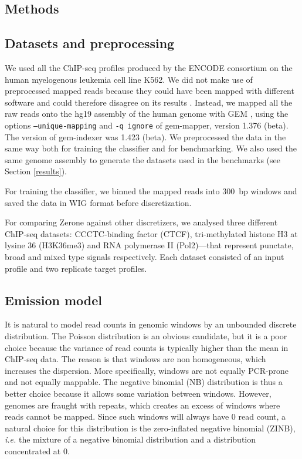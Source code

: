 \documentclass{bioinfo}
\begin{document}
\begin{methods}
\section{Methods}

\subsection{Datasets and preprocessing}
We used all the ChIP-seq profiles produced by the ENCODE consortium on the human
myelogenous leukemia cell line K562. We did not make use of preprocessed mapped
reads because they could have been mapped with different software and could
therefore disagree on its results \citep{pmid21059603}. Instead, we mapped all
the raw reads onto the hg19 assembly of the human genome with GEM
\citep{pmid23103880}, using the options \texttt{--unique-mapping} and
\texttt{-q ignore} of gem-mapper, version 1.376 (beta). The version of
gem-indexer was 1.423 (beta). We preprocessed the data in the same
way both for training the classifier and for benchmarking. We also used the
same genome assembly to generate the datasets used in the benchmarks (see
Section \ref{results}).

For training the classifier, we binned the mapped reads into 300~bp windows and
saved the data in WIG format before discretization.

For comparing Zerone against other discretizers, we analysed three different
ChIP-seq datasets: CCCTC-binding factor (CTCF), tri-methylated histone H3 at
lysine 36 (H3K36me3) and RNA polymerase II (Pol2)---that represent punctate,
broad and mixed type signals respectively. Each dataset consisted of an input
profile and two replicate target profiles.

\subsection{Emission model}
\label{sub:emissions}
It is natural to model read counts in genomic windows by an unbounded
discrete distribution. The Poisson distribution is an obvious candidate,
but it is a poor choice because the variance of read counts is typically
higher than the mean in ChIP-seq data. The reason is that windows are non
homogeneous, which increases the dispersion. More specifically, windows
are not equally PCR-prone and not equally mappable. The negative binomial
(NB) distribution is thus a better choice because it allows some variation
between windows. However, genomes are fraught with repeats, which creates
an excess of windows where reads cannot be mapped. Since such windows
will always have 0 read count, a natural choice for this distribution is
the zero-inflated negative binomial (ZINB), \textit{i.e.} the mixture of
a negative binomial distribution and a distribution concentrated at 0.


\end{methods}
\end{document}
